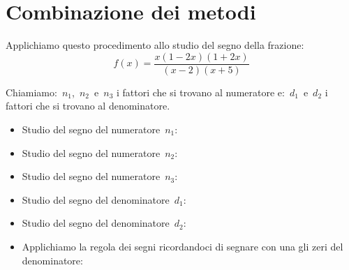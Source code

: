 \section{Combinazione dei metodi}
\label{sec:dis_combinazione}

 \begin{esempio}{}{}
Applichiamo questo procedimento allo studio del segno della frazione:
\[f(x)=\frac{x(1 -2 x)(1 + 2 x)}{(x -2)(x +5)}\]

Chiamiamo:~\(n_1\),~\(n_2\)~e~\(n_3\) i fattori che si trovano al 
numeratore 
e:~\(d_1\)~e~\(d_2\) i fattori che si trovano al denominatore.

\begin{itemize} [noitemsep, left=0mm]
\item Studio del segno del numeratore~\(n_1\):\\
\hspace*{-5mm} 
\item Studio del segno del numeratore~\(n_2\):\\
\hspace*{-5mm} 
\item Studio del segno del numeratore~\(n_3\):\\
\hspace*{-5mm} 
\item Studio del segno del denominatore~\(d_1\):\\
\hspace*{-5mm} 
\item Studio del segno del denominatore~\(d_2\):\\
\hspace*{-5mm} 
\item Applichiamo la regola dei segni ricordandoci di segnare con una 
gli zeri del denominatore:


\end{itemize}
\end{esempio}
